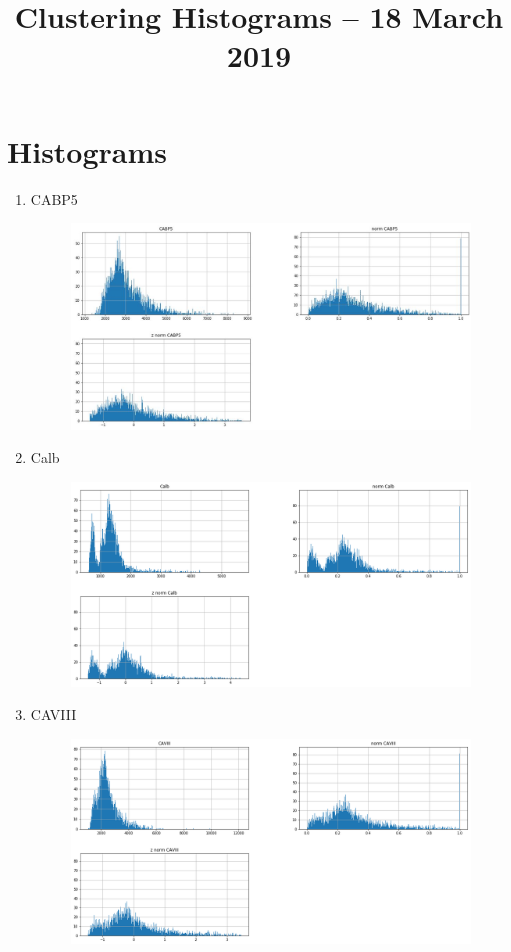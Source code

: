 \documentclass[11pt]{article}
\title{Clustering Histograms -- 18 March 2019}
\author{\Name}
\date{}
\begin{document}
\maketitle

\newpage
\section*{Histograms}
\begin{enumerate}
\item CABP5
\begin{figure}[h!]
  \includegraphics[width=\linewidth]{hist/CABP5.JPG}
\end{figure}
\item Calb
\begin{figure}[h!]
  \includegraphics[width=\linewidth]{hist/Calb.png}
\end{figure}
\newpage
\item CAVIII
\begin{figure}[h!]
  \includegraphics[width=\linewidth]{hist/CAVIII.png}

\end{figure}
\end{enumerate}
\end{document}

